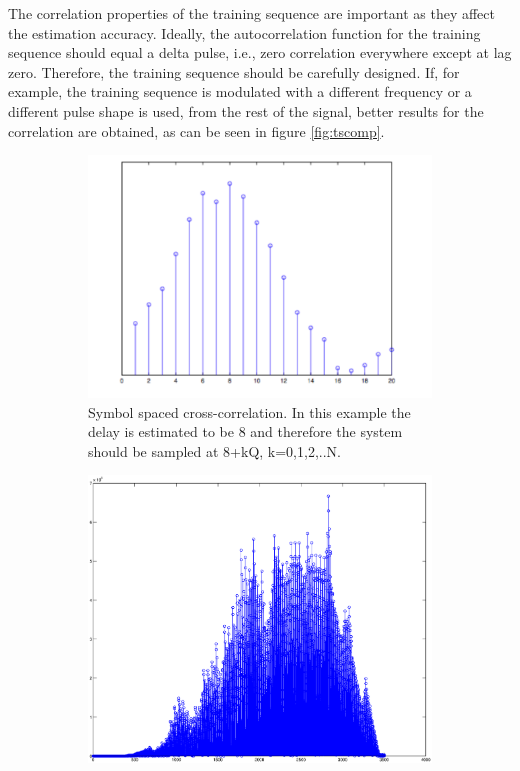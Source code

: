 \documentclass[12pt,a4paper,openright]{article}
\begin{document}
The correlation properties of the training sequence are important as they affect the estimation accuracy. Ideally, the autocorrelation function for the training sequence should equal a delta pulse, i.e., zero correlation everywhere except at lag zero. Therefore, the training sequence should be carefully designed. If, for example, the training sequence is modulated with a different frequency or a different pulse shape is used, from the rest of the signal, better results for the correlation are obtained, as can be seen in figure \ref{fig:tscomp}. 

\begin{figure}[h] 
  \begin{subfigure}[b]{0.5\linewidth}
    \centering
    \includegraphics[width=1\linewidth]{ss.pdf} 
    \caption{Symbol spaced cross-correlation. In this example the delay is estimated to be 8 and therefore the system should be sampled at 8+kQ, k=0,1,2,..N.} 
    \label{fig:a} 
    \vspace{4ex}
  \end{subfigure}%
  \quad
  \begin{subfigure}[b]{0.5\linewidth}
    \centering
    \includegraphics[width=1\linewidth]{20.eps} 

\end{subfigure}
\end{figure}
\end{document}
